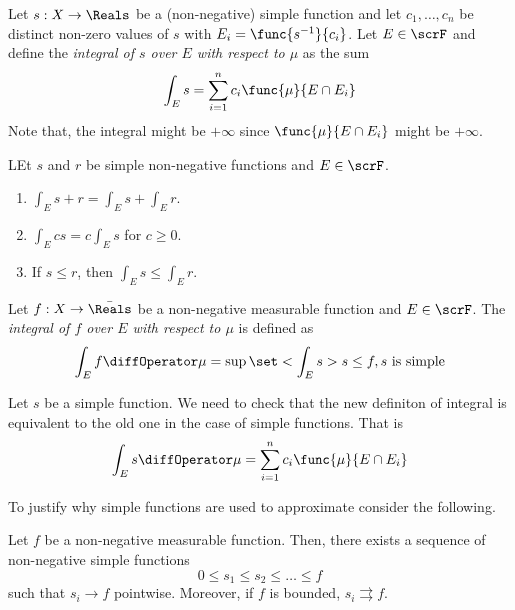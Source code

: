 \begin{definition}
    Let \(s:X\to\Reals\) be a (non-negative) simple function and let \(c_1, \dots,c_n\) be distinct non-zero values of \(s\) with \(E_i = \func{s^{-1}}{c_i}\). Let \(E \in \scrF\) and define the \textit{integral of \(s\) over \(E\) with respect to \(\mu\)} as the sum
    \begin{equation*}
        \int_E s  = \sum_{i = 1}^n c_i \func{\mu}{E \cap E_i}
    \end{equation*}
    Note that, the integral might be \(+\infty\) since \(\func{\mu}{E \cap E_i}\) might be \(+\infty\).
\end{definition}

\begin{proposition}
    LEt \(s\) and \(r\) be simple non-negative functions and \(E \in \scrF\).
    \begin{enumerate}
        \item \(\int_E s + r  = \int_E s   + \int_E r \).
        \item \(\int_E c s  = c\int_E s  \) for \(c \geq 0\).
        \item If \(s \leq r\), then \(\int_E s  \leq  \int_E r \).
    \end{enumerate}
\end{proposition}

\begin{definition}
    Let \(f:X \to \bar{\Reals}\) be a non-negative measurable function and \(E \in \scrF\). The \textit{integral of \(f\) over \(E\) with respect to \(\mu\)} is defined as 
    \begin{equation*}
        \int_E f \diffOperator \mu = \sup \set<\int_E s >{s\leq f, s\ \mathrm{is\ simple}}
    \end{equation*}
\end{definition}

Let \(s\) be a simple function. We need to check that the new definiton of integral is equivalent to the old one in the case of simple functions. That is 
\begin{equation*}
    \int_E s \diffOperator \mu =  \sum_{i = 1}^n c_i \func{\mu}{E \cap E_i}
\end{equation*}

To justify why simple functions are used to approximate consider the following. 

\begin{theorem}
    Let \(f\) be a non-negative measurable function. Then, there exists a sequence of non-negative simple functions 
    \begin{equation*}
        0 \leq s_1 \leq s_2 \leq \dots \leq f
    \end{equation*}
    such that \(s_i \to f\) pointwise. Moreover, if \(f\) is bounded, \(s_i \rightrightarrows f\).
\end{theorem}

